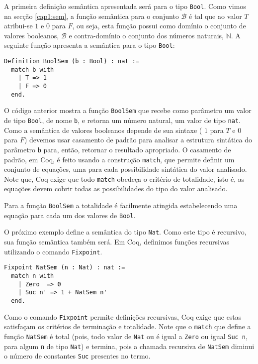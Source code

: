 A primeira defini\c{c}\~ao sem\^antica apresentada ser\'a para o tipo
\texttt{Bool}. Como vimos na sec\c{c}\~ao \ref{cap1:sem}, a
fun\c{c}\~ao sem\^antica para o conjunto $\mathcal{B}$ \'e tal que
ao valor $T$ atribui-se $1$ e $0$ para $F$, ou seja, esta fun\c{c}\~ao
possui como dom\'inio o conjunto de valores booleanos, $\mathcal{B}$
e contra-dom\'inio o conjunto dos n\'umeros naturais, $\mathbb{N}$. 
A seguinte fun\c{c}\~ao apresenta a sem\^antica para o tipo \texttt{Bool}:
\begin{lstlisting}
Definition BoolSem (b : Bool) : nat :=
  match b with
    | T => 1
    | F => 0
  end.
\end{lstlisting}
O c\'odigo anterior mostra a fun\c{c}\~ao \texttt{BoolSem} que recebe
como par\^ametro um valor de tipo \texttt{Bool}, de nome \texttt{b}, e
retorna um n\'umero natural, um valor de tipo \texttt{nat}. Como a
sem\^antica de valores booleanos depende de sua sintaxe ( $1$ para $T$
e $0$ para $F$) devemos usar casamento de padr\~ao para analisar a
estrutura sint\'atica do par\^ametro \texttt{b} para, ent\~ao,
retornar o resultado apropriado. O casamento de padr\~ao, em Coq, \'e
feito usando a constru\c{c}\~ao \texttt{match}, que permite definir um
conjunto de equa\c{c}\~oes, uma para cada possibilidade sint\'atica do
valor analisado. Note que, Coq exige que todo \texttt{match}
obede\c{c}a o crit\'erio de totalidade, isto é, as equa\c{c}\~oes
devem cobrir todas as possibilidades do tipo do valor analisado.

Para a fun\c{c}\~ao \texttt{BoolSem} a totalidade \'e facilmente
atingida estabelecendo uma equa\c{c}\~ao para cada um dos valores de
\texttt{Bool}.

O pr\'oximo exemplo define a sem\^antica do tipo \texttt{Nat}. Como
este tipo \'e recursivo, sua fun\c{c}\~ao sem\^antica tamb\'em ser\'a.
Em Coq, definimos fun\c{c}\~oes recursivas utilizando o comando
\texttt{Fixpoint}.
 
\begin{lstlisting}
Fixpoint NatSem (n : Nat) : nat :=
  match n with
    | Zero  => 0
    | Suc n' => 1 + NatSem n'
  end.
\end{lstlisting}
Como o comando \texttt{Fixpoint} permite defini\c{c}\~oes recursivas,
Coq exige que estas satisfa\c{c}am os crit\'erios de termina\c{c}\~ao
e totalidade. Note que o \texttt{match} que define a fun\c{c}\~ao
\texttt{NatSem} \'e total (pois, todo valor de \texttt{Nat} ou \'e
igual a \texttt{Zero} ou igual \texttt{Suc n}, para algum \texttt{n}
de tipo \texttt{Nat}) e termina, pois a chamada recursiva de
\texttt{NatSem} diminui o n\'umero de constantes \texttt{Suc}
presentes no termo.

